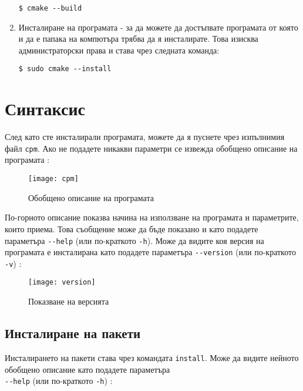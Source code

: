 \begin{enumerate}
\begin{lstlisting}[style=shell]
$ cmake --build
\end{lstlisting}

    \item Инсталиране на програмата - за да можете да достъпвате програмата от
          която и да е папака на компютъра трябва да я инсталирате. Това изисква
          администраторски права и става чрез следната команда:

\begin{lstlisting}[style=shell]
$ sudo cmake --install
\end{lstlisting}

\end{enumerate}


\section{Синтаксис}

След като сте инсталирали програмата, можете да я пуснете чрез изпълнимия файл
\texttt{cpm}. Ако не подадете никакви параметри се извежда обобщено описание на
програмата :

\begin{figure}[h]
    \centering
    \texttt{[image: cpm]}
    \caption{Обобщено описание на програмата}
    \label{fig:cpm}
\end{figure}

По-горното описание показва начина на използване на програмата и параметрите,
които приема. Това съобщение може да бъде показано и като подадете параметъра
\texttt{-{}-help} (или по-краткото \texttt{-h}). Може да видите коя версия на
програмата е инсталирана като подадете параметъра \texttt{-{}-version} (или
по-краткото \texttt{-v}) :

\begin{figure}[H]
    \centering
    \texttt{[image: version]}
    \caption{Показване на версията}
    \label{fig:version}
\end{figure}


\subsection{Инсталиране на пакети}

Инсталирането на пакети става чрез командата \texttt{install}. Може да видите
нейното обобщено описание като подадете параметъра \\
\texttt{-{}-help} (или по-краткото \texttt{-h}) :

